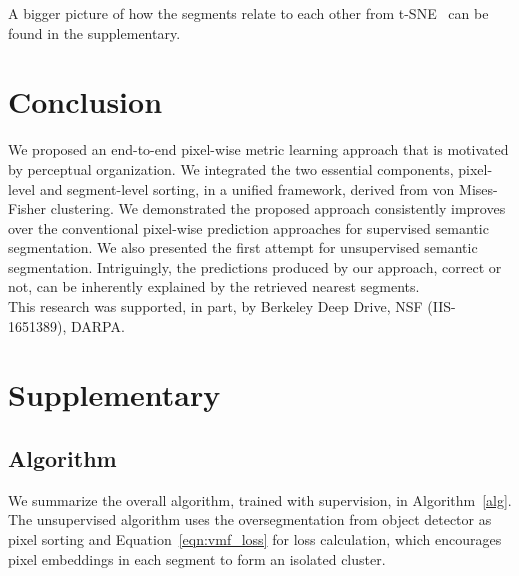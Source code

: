 \documentclass[10pt,twocolumn,letterpaper]{article}
\begin{document}
A bigger picture of how the segments relate to each other from t-SNE~\cite{maaten2008visualizing} can be found in the supplementary.







 
\section{Conclusion}
\label{sec:con}


We proposed an end-to-end pixel-wise metric learning approach that is motivated by perceptual organization.
We integrated the two essential components, pixel-level and segment-level sorting, in a unified framework, derived from von Mises-Fisher clustering.
We demonstrated the proposed approach consistently improves over the conventional pixel-wise prediction approaches for supervised semantic segmentation.
We also presented the first attempt for unsupervised semantic segmentation.
Intriguingly, the predictions produced by our approach, correct or not, can be inherently explained by the retrieved nearest segments. \\

\vspace{-6 pt}
 This research was supported, in part, by Berkeley Deep Drive, NSF (IIS-1651389), DARPA.

 
\newpage

{\small


}

\clearpage



\section{Supplementary}

\subsection{Algorithm}
\label{sec:alg}

We summarize the overall algorithm, trained with supervision, in Algorithm~\ref{alg}. The unsupervised algorithm uses the oversegmentation from object detector as pixel sorting and Equation~\ref{eqn:vmf_loss} for loss calculation, which encourages pixel embeddings in each segment to form an isolated cluster.
\end{document}
